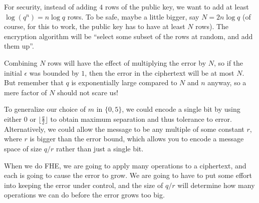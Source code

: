 For security, instead of adding \(4\) rows of the public key, we want to
add at least \(\log( q^{n} ) = n\log q\) rows. To be safe,
maybe a little bigger, say \(N = 2n\log q\) (of course, for this to
work, the public key has to have at least \(N\) rows). The encryption
algorithm will be ``select some subset of the rows at random, and add
them up''.

Combining \(N\) rows will have the effect of multiplying the error by
\(N\), so if the initial \(\epsilon\) was bounded by \(1\), then the
error in the ciphertext will be at most \(N\). But remember that \(q\)
is exponentially large compared to \(N\) and \(n\) anyway, so a mere
factor of \(N\) should not scare us!

To generalize our choice of \(m\) in \(\{ 0,5\}\), we could encode a
single bit by using either \(0\) or \(\lfloor\frac{q}{2}\rfloor\) to
obtain maximum separation and thus tolerance to error. Alternatively, we
could allow the message to be any multiple of some constant \(r\), where
\(r\) is bigger than the error bound, which
allows you to encode a message space of size \(q/r\) rather than just a
single bit.

When we do FHE, we are going to apply many operations to a ciphertext,
and each is going to cause the error to grow. We are going to have to
put some effort into keeping the error under control, and the size of
\(q/r\) will determine how many operations we can do before the error
grows too big.

